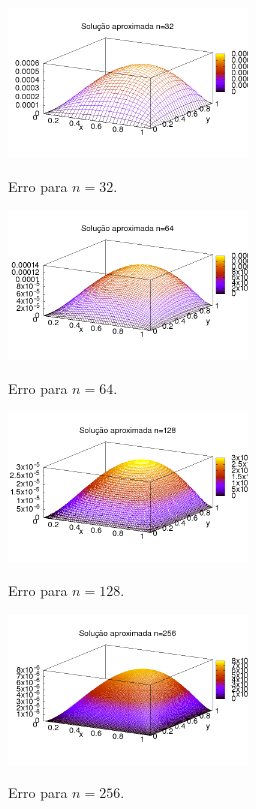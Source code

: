 \documentclass[a4paper]{article} %
\begin{document}
\begin{figure}[!htb]
\centering
\includegraphics[width=2.5in]{erro_n_32.png}
\label{fig5}
\caption{Erro para $n=32$.}
\end{figure}
\begin{figure}[!htb]
\centering
\includegraphics[width=2.5in]{erro_n_64.png}
\label{fig5}
\caption{Erro para $n=64$.}
\end{figure}
\begin{figure}[!htb]
\centering
\includegraphics[width=2.5in]{erro_n_128.png}
\label{fig5}
\caption{Erro para $n=128$.}
\end{figure}

\begin{figure}[!htb]
\centering
\includegraphics[width=2.5in]{erro_n_256.png}
\label{fig5}
\caption{Erro para $n=256$.}
\end{figure}
\end{document}
